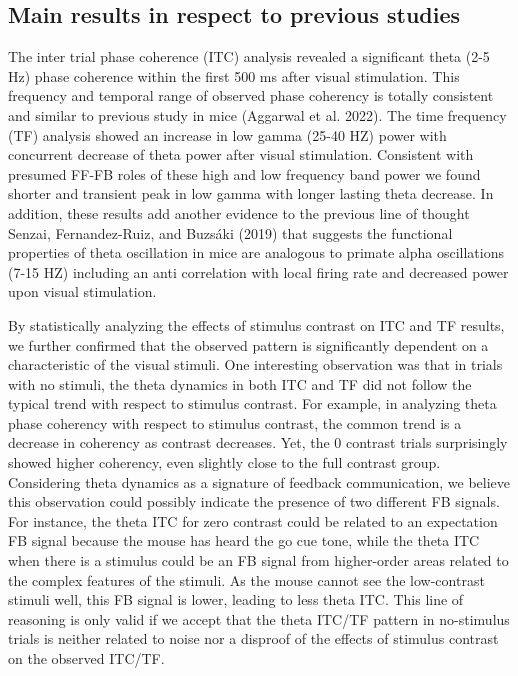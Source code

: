 \documentclass[
  letterpaper,
  DIV=11,
  numbers=noendperiod]{scrartcl}
\begin{document}
\subsection{Main results in respect to previous
studies}\label{main-results-in-respect-to-previous-studies}

The inter trial phase coherence (ITC) analysis revealed a significant
theta (2-5 Hz) phase coherence within the first 500 ms after visual
stimulation. This frequency and temporal range of observed phase
coherency is totally consistent and similar to previous study in mice
(Aggarwal et al. 2022). The time frequency (TF) analysis showed an
increase in low gamma (25-40 HZ) power with concurrent decrease of theta
power after visual stimulation. Consistent with presumed FF-FB roles of
these high and low frequency band power we found shorter and transient
peak in low gamma with longer lasting theta decrease. In addition, these
results add another evidence to the previous line of thought Senzai,
Fernandez-Ruiz, and Buzsáki (2019) that suggests the functional
properties of theta oscillation in mice are analogous to primate alpha
oscillations (7-15 HZ) including an anti correlation with local firing
rate and decreased power upon visual stimulation.

By statistically analyzing the effects of stimulus contrast on ITC and
TF results, we further confirmed that the observed pattern is
significantly dependent on a characteristic of the visual stimuli. One
interesting observation was that in trials with no stimuli, the theta
dynamics in both ITC and TF did not follow the typical trend with
respect to stimulus contrast. For example, in analyzing theta phase
coherency with respect to stimulus contrast, the common trend is a
decrease in coherency as contrast decreases. Yet, the 0 contrast trials
surprisingly showed higher coherency, even slightly close to the full
contrast group. Considering theta dynamics as a signature of feedback
communication, we believe this observation could possibly indicate the
presence of two different FB signals. For instance, the theta ITC for
zero contrast could be related to an expectation FB signal because the
mouse has heard the go cue tone, while the theta ITC when there is a
stimulus could be an FB signal from higher-order areas related to the
complex features of the stimuli. As the mouse cannot see the
low-contrast stimuli well, this FB signal is lower, leading to less
theta ITC. This line of reasoning is only valid if we accept that the
theta ITC/TF pattern in no-stimulus trials is neither related to noise
nor a disproof of the effects of stimulus contrast on the observed
ITC/TF.
\end{document}
